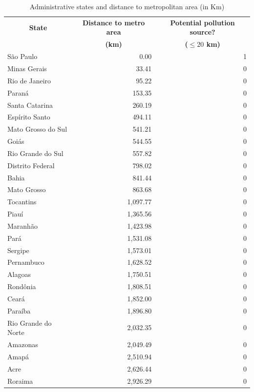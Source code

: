 \begin{table}[htbp]
  \centering
  \caption{Administrative states and distance to metropolitan area (in Km)}
  \begin{tabular}{lrr}
    \midrule
    \midrule
    \multicolumn{1}{c}{\textbf{State}} &
    \multicolumn{1}{c}{\textbf{Distance to metro area}} &
    \multicolumn{1}{c}{\textbf{Potential pollution source?}} \\
    \multicolumn{1}{c}{} &
    \multicolumn{1}{c}{\textbf{(km)}} &
    \multicolumn{1}{c}{\textbf{($\leq 20$ km)}} \\
    \midrule
    São Paulo & 0.00 & 1 \\
    Minas Gerais & 33.41 & 0 \\
    Rio de Janeiro & 95.22 & 0 \\
    Paraná & 153.35 & 0 \\
    Santa Catarina & 260.19 & 0 \\
    Espírito Santo & 494.11 & 0 \\
    Mato Grosso do Sul & 541.21 & 0 \\
    Goiás & 544.55 & 0 \\
    Rio Grande do Sul & 557.82 & 0 \\
    Distrito Federal & 798.02 & 0 \\
    Bahia & 841.44 & 0 \\
    Mato Grosso & 863.68 & 0 \\
    Tocantins & 1,097.77 & 0 \\
    Piauí & 1,365.56 & 0 \\
    Maranhão & 1,423.98 & 0 \\
    Pará & 1,531.08 & 0 \\
    Sergipe & 1,573.01 & 0 \\
    Pernambuco & 1,628.52 & 0 \\
    Alagoas & 1,750.51 & 0 \\
    Rondônia & 1,808.51 & 0 \\
    Ceará & 1,852.00 & 0 \\
    Paraíba & 1,896.80 & 0 \\
    Rio Grande do Norte & 2,032.35 & 0 \\
    Amazonas & 2,049.49 & 0 \\
    Amapá & 2,510.94 & 0 \\
    Acre & 2,626.44 & 0 \\
    Roraima & 2,926.29 & 0 \\
    \bottomrule
    \bottomrule
  \end{tabular}
  \label{table_state_metro_distances}
\end{table}
